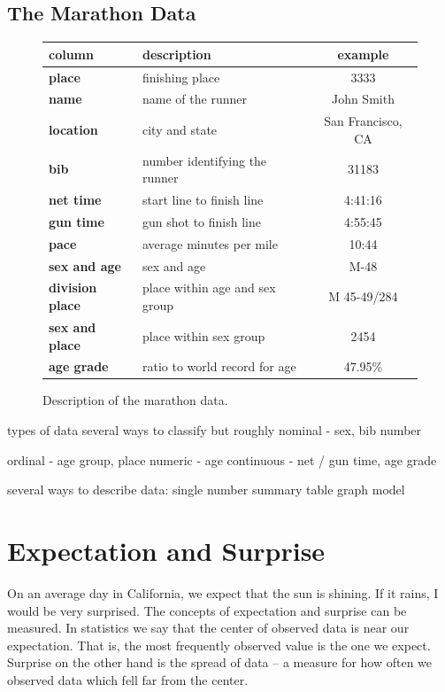 \documentclass{tufte-book} %
\begin{document}
\section{The Marathon Data}
\begin{figure}
	\centering
	\begin{tabular} { l | l | c }
		\textbf{column} & \textbf{description} & \textbf{example} \\ \hline
		\textbf{place} & finishing place & 3333\\ 
		\textbf{name} & name of the runner & John Smith \\ 
		\textbf{location} & city and state & San Francisco, CA \\ 
		\textbf{bib} & number identifying the runner & 31183 \\ 
		\textbf{net time} & start line to finish line & 4:41:16 \\ 
		\textbf{gun time} & gun shot to finish line & 4:55:45 \\ 
		\textbf{pace} & average minutes per mile & 10:44 \\
		\textbf{sex and age} & sex and age & M-48\\ 
		\textbf{division place} & place within age and sex group & M 45-49/284 \\ 
		\textbf{sex and place} & place within sex group & 2454 \\ 
		\textbf{age grade} & ratio to world record for age & 47.95\% \\
	\end{tabular}
	\label{tab:marathon-data}
	\caption{Description of the marathon data.}
\end{figure}


types of data
several ways to classify but roughly
nominal - sex, bib number

ordinal - age group, place
numeric - age
continuous - net / gun time, age grade

several ways to describe data:
single number
summary table
graph
model

\chapter{Expectation and Surprise}
\label{ch:expectation-surprise}
On an average day in California, we expect that the sun is shining. If it rains, I would be very surprised. The concepts of expectation and surprise can be measured. In statistics we say that the center of observed data is near our expectation. That is, the most frequently observed value is the one we expect. Surprise on the other hand is the spread of data -- a measure for how often we observed data which fell far from the center.
\end{document}
